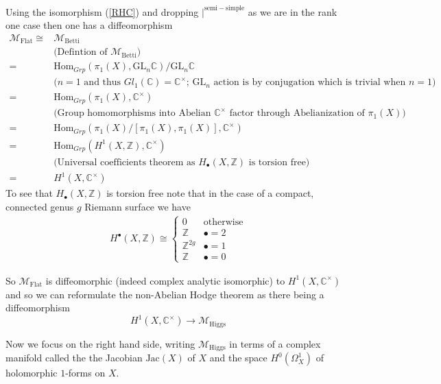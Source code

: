 Using the isomorphism (\ref{RHC}) and dropping $|^{\mathrm{semi-simple}}$ as we are in the rank one case then one has a diffeomorphism
\begin{align*}
    \mathcal{M}_{\mathrm{Flat}} \cong & \mathcal{M}_{\mathrm{Betti}}\\
    & \textrm{(Defintion of $\mathcal{M}_{\mathrm{Betti}}$)} \\
     = & \mathrm{Hom}_{Grp}(\pi_1 ( X) , \mathrm{GL}_n \mathbb{C} ) / \mathrm{GL}_n \mathbb{C}\\
    & \textrm{($n=1$ and thus $Gl_{1}(\mathbb{C})=\mathbb{C} ^\times$; $\mathrm{GL}_n$ action is by conjugation which is trivial when $n=1$)}\\
    = & \mathrm{Hom}_{Grp}(\pi_1 ( X) , \mathbb{C} ^\times)\\
    & \textrm{(Group homomorphisms into Abelian $\mathbb{C}^\times$ factor through Abelianization of $\pi_{1}(X)$)}\\
    = & \mathrm{Hom}_{Grp}(\pi_1 ( X)/[\pi_1(X) , \pi_1(X)], \mathbb{C} ^\times)\\
    = & \mathrm{Hom}_{Grp}(H^1(X, \mathbb{Z}), \mathbb{C}^\times) \\
    & \textrm{(Universal coefficients theorem as $H_\bullet(X, \mathbb{Z})$ is torsion free)}\\
    = & H^1(X,\mathbb{C}^\times)
\end{align*}
To see that $H_\bullet(X,\mathbb{Z})$ is torsion free note that in the case of a compact, connected genus $g$ Riemann surface we have 
\begin{align}\label{CohomologyOfX}
H^\bullet (X, \mathbb{Z} ) \cong\begin{cases}
0 & \textrm{otherwise}\\
\mathbb{Z} & \bullet=2\\
\mathbb{Z}^{2g} & \bullet=1\\
\mathbb{Z} & \bullet=0
\end{cases} 
\end{align}

So $\mathcal{M}_{\mathrm{Flat}}$ is diffeomorphic (indeed complex analytic isomorphic) to $H^1(X,\mathbb{C}^\times)$ and so we can reformulate the non-Abelian Hodge theorem as there being a diffeomorphism
\begin{equation*}
H^1(X, \mathbb{C} ^\times) \rightarrow \mathcal{M}_{\mathrm{Higgs}}
\end{equation*}

Now we focus on the right hand side, writing $\mathcal{M}_{\mathrm{Higgs}}$ in terms of a complex manifold called the the Jacobian $\textrm{Jac}(X)$ of $X$ and the space $H^0 ( \Omega_X ^1 ) $ of holomorphic $1$-forms on $X$.\\

